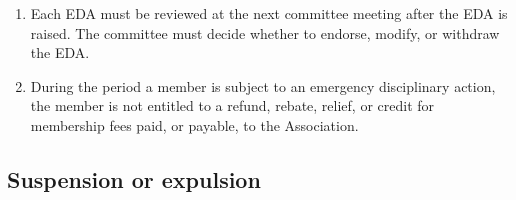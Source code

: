 \documentclass[../constitution.tex]{subfiles}
\begin{document}
\begin{enumerate}
  \item Each EDA must be reviewed at the next committee meeting after the EDA is raised. The committee must decide whether to endorse, modify, or withdraw the EDA.

  \item During the period a member is subject to an emergency disciplinary action, the member is not entitled to a refund, rebate, relief, or credit for membership fees paid, or payable, to the Association.

\end{enumerate}

\hypertarget{suspension-or-expulsion}{%
  \subsection{Suspension or expulsion}\label{suspension-or-expulsion}}
\end{document}
